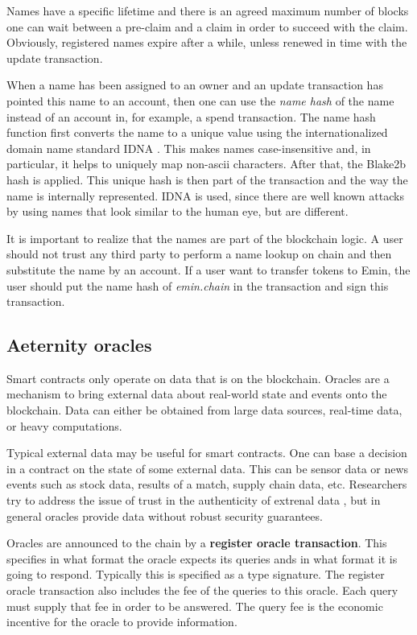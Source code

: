 Names have a specific lifetime and there is an agreed maximum number of blocks one can wait
between a pre-claim and a claim in order to succeed with the claim.
Obviously, registered names expire after a while, unless renewed in time
with the update transaction.

When a name has been assigned to an owner and an update transaction
has pointed this name to an account, then one can use the \textit{name
  hash} of the name instead of an account in, for example, a spend
transaction. The name hash function first converts the name to a unique value using the
internationalized domain name standard IDNA \cite{idna2008}. This makes names
case-insensitive and, in particular, it helps to uniquely map
non-ascii characters. After that, the Blake2b hash is applied. This unique
hash is then part of the transaction and the way the name is
internally represented.
IDNA is used, since there are well known attacks by using names that
look similar to the human eye, but are different.

It is important to realize that the names are part of the blockchain
logic. A user should not trust any third party to perform a name lookup on
chain and then substitute the name by an account. If a user want to
transfer tokens to Emin, the user should put the name hash of \textit{emin.chain} in
the transaction and sign this transaction.


\subsection{Aeternity oracles}
\label{sect:aeoracle}


Smart contracts only operate on data that is on the
blockchain. Oracles are a mechanism to bring external data about
real-world state and events onto the blockchain. Data can either be
obtained from large data sources, real-time data, or heavy computations.

Typical external data may be useful for smart contracts. One can base
a decision in a contract on the state of some external data. This can be sensor data or
news events such as stock data, results of a match, supply chain data,
etc.
Researchers try to address the issue of trust in the authenticity of extrenal data
\cite{zhang2016town,guarnizo2019pdfs, adler2018astraea}, but in
general oracles provide data without robust security guarantees.

Oracles are announced to the chain by a \textbf{register oracle
  transaction}. This specifies in what format the oracle expects its
queries ands in what format it is going to respond. Typically this is
specified as a type signature. The register oracle transaction also
includes the fee of the queries to this oracle. Each query must supply
that fee in order to be answered. The query fee is the economic
incentive for the oracle to provide information.

